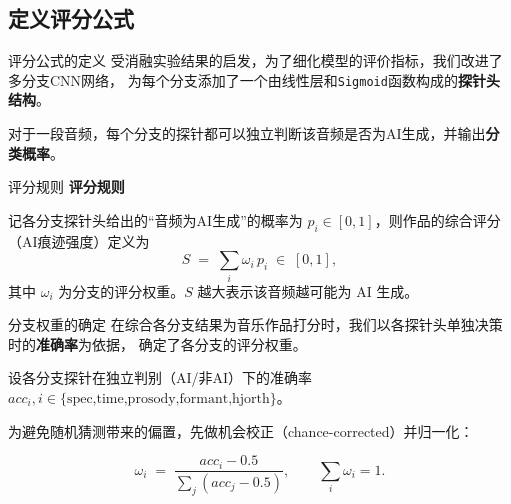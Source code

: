 \documentclass[aspectratio=169]{beamer}
\providecommand{\paragraph}[1]{\smallskip\textbf{#1}\par}
\begin{document}
\subsection{定义评分公式}
\begin{frame}{评分公式的定义}
受消融实验结果的启发，为了细化模型的评价指标，我们改进了多分支CNN网络，
为每个分支添加了一个由线性层和\texttt{Sigmoid}函数构成的\textbf{探针头结构}。

对于一段音频，每个分支的探针都可以独立判断该音频是否为AI生成，并输出\textbf{分类概率}。
\end{frame}

\begin{frame}{评分规则}
\paragraph{评分规则} 记各分支探针头给出的“音频为AI生成”的概率为
$p_i\in[0,1]$，则作品的综合评分（AI痕迹强度）定义为
\begin{equation}
    S \;=\; \sum_{i} \omega_i\, p_i \;\in\;[0,1],
    \label{eq:ai_score}
\end{equation}
其中 $\omega_i$ 为分支的评分权重。$S$ 越大表示该音频越可能为 AI 生成。
\end{frame}

\begin{frame}{分支权重的确定}
在综合各分支结果为音乐作品打分时，我们以各探针头单独决策时的\textbf{准确率}为依据，
确定了各分支的评分权重。

设各分支探针在独立判别（AI/非AI）下的准确率
$acc_i,i\in\{\text{spec,time,prosody,formant,hjorth}\}$。

为避免随机猜测带来的偏置，先做机会校正（chance-corrected）并归一化：

\begin{equation}
    \omega_i \;=\; \frac{acc_i-0.5}{\sum_j (acc_j-0.5)},\qquad 
    \sum_i \omega_i = 1.
    \label{eq:branch_weight}
\end{equation}
\end{frame}
\end{document}
